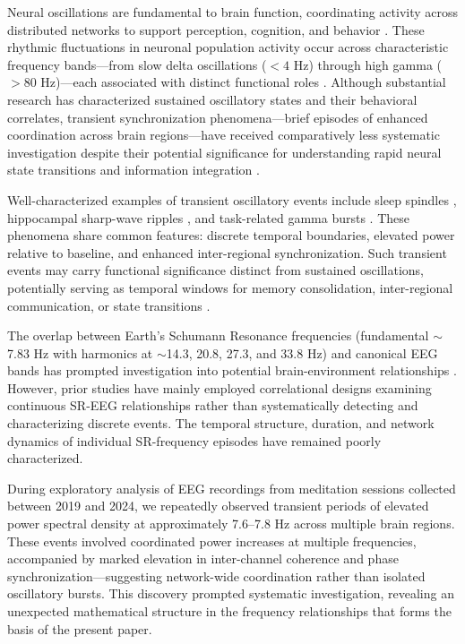 \documentclass[11pt,a4paper]{article}
\begin{document}
Neural oscillations are fundamental to brain function, coordinating activity across distributed networks to support perception, cognition, and behavior \parencite{gy_rgy_buzs_ki_c98dac5c, pascal_fries_7b9d1ced}. These rhythmic fluctuations in neuronal population activity occur across characteristic frequency bands---from slow delta oscillations ($<4$ Hz) through high gamma ($>80$ Hz)---each associated with distinct functional roles \parencite{wolfgang_klimesch_be1f7786, engel2010beta, cohen2017where}. Although substantial research has characterized sustained oscillatory states and their behavioral correlates, transient synchronization phenomena---brief episodes of enhanced coordination across brain regions---have received comparatively less systematic investigation despite their potential significance for understanding rapid neural state transitions and information integration \parencite{siegel2012spectral, canolty2010functional}.

Well-characterized examples of transient oscillatory events include sleep spindles \parencite{fernandez2020sleep}, hippocampal sharp-wave ripples \parencite{buzsaki2015hippocampal}, and task-related gamma bursts \parencite{fries2001modulation}. These phenomena share common features: discrete temporal boundaries, elevated power relative to baseline, and enhanced inter-regional synchronization. Such transient events may carry functional significance distinct from sustained oscillations, potentially serving as temporal windows for memory consolidation, inter-regional communication, or state transitions \parencite{john_lisman_100e4cf6}.

The overlap between Earth's Schumann Resonance frequencies (fundamental $\sim$7.83 Hz with harmonics at $\sim$14.3, 20.8, 27.3, and 33.8 Hz) and canonical EEG bands has prompted investigation into potential brain-environment relationships \parencite{konig1974eeg, cherry2002schumann, persinger2008possible, saroka2016similar}. However, prior studies have mainly employed correlational designs examining continuous SR-EEG relationships rather than systematically detecting and characterizing discrete events. The temporal structure, duration, and network dynamics of individual SR-frequency episodes have remained poorly characterized.

During exploratory analysis of EEG recordings from meditation sessions collected between 2019 and 2024, we repeatedly observed transient periods of elevated power spectral density at approximately 7.6--7.8 Hz across multiple brain regions. These events involved coordinated power increases at multiple frequencies, accompanied by marked elevation in inter-channel coherence and phase synchronization---suggesting network-wide coordination rather than isolated oscillatory bursts. This discovery prompted systematic investigation, revealing an unexpected mathematical structure in the frequency relationships that forms the basis of the present paper.
\end{document}
